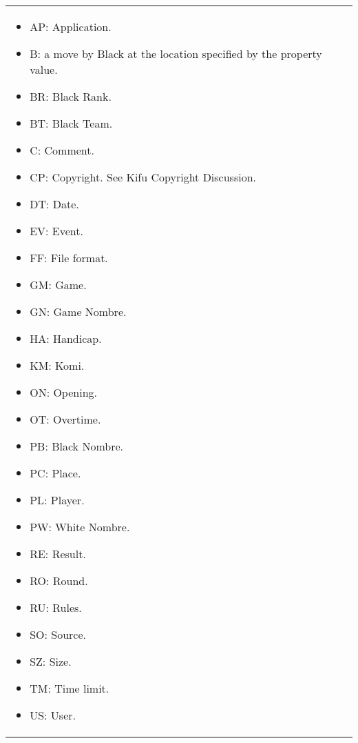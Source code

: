 \begin{longtable}{|p{\varnamewidth}|p{\vardescrwidth}|l}
\begin{itemize}
\item AP: Application.

\item B: a move by Black at the location specified by the property value.

\item BR: Black Rank.

\item BT: Black Team.

\item C: Comment.

\item CP: Copyright. See Kifu Copyright Discussion.

\item DT: Date.

\item EV: Event.

\item FF: File format.

\item GM: Game.

\item GN: Game Nombre.

\item HA: Handicap.

\item KM: Komi.

\item ON: Opening.

\item OT: Overtime.

\item PB: Black Nombre.

\item PC: Place.

\item PL: Player.

\item PW: White Nombre.

\item RE: Result.

\item RO: Round.

\item RU: Rules.

\item SO: Source.

\item SZ: Size.

\item TM: Time limit.

\item US: User.


\end{itemize}
\end{longtable}

